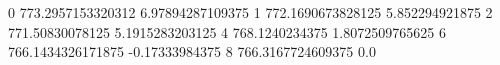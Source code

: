 0 773.2957153320312 6.97894287109375
1 772.1690673828125 5.852294921875
2 771.50830078125 5.1915283203125
4 768.1240234375 1.8072509765625
6 766.1434326171875 -0.17333984375
8 766.3167724609375 0.0
